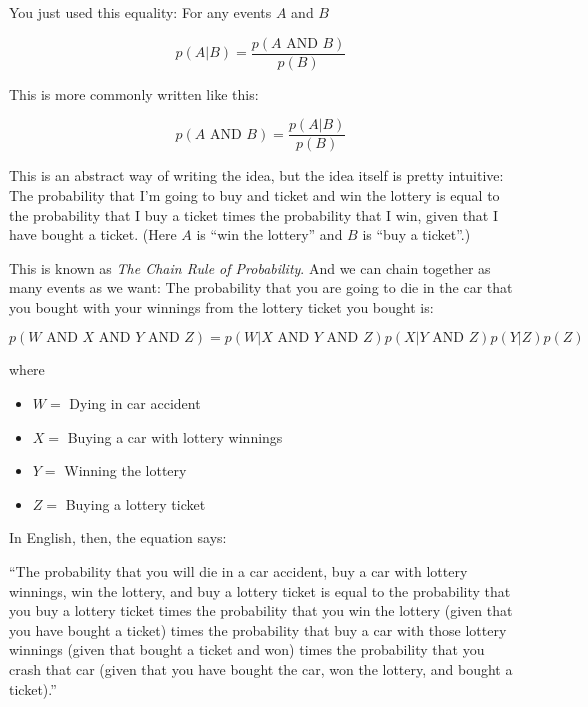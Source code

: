 You just used this equality: For any events $A$ and $B$

$$p(A | B) = \frac{p(A \text{ AND } B)}{p(B)}$$

This is more commonly written like this:

$$p(A \text{ AND } B) = \frac{p(A | B)}{p(B)}$$

This is an abstract way of writing the idea, but the idea itself
is pretty intuitive: The probability that I'm going to buy and ticket
and win the lottery is equal to the probability that I buy a ticket
times the probability that I win, given that I have bought a ticket.
(Here $A$ is ``win the lottery'' and $B$ is ``buy a ticket''.)

This is known as \textit{The Chain Rule of Probability}.  And we can
chain together as many events as we want: The probability that you are
going to die in the car that you bought with your winnings from the
lottery ticket you bought is:

$$p(W \text{ AND } X \text{ AND } Y \text{ AND } Z) = p( W | X \text{ AND } Y \text{ AND } Z) p( X |  Y \text{ AND } Z) p (Y | Z) p(Z)$$

where

\begin{itemize}
\item $W =$ Dying in car accident
\item $X =$ Buying a car with lottery winnings
\item $Y =$ Winning the lottery
\item $Z =$ Buying a lottery ticket
\end{itemize}

In English, then, the equation says:

``The probability that you will die in a car accident, buy a car with
lottery winnings, win the lottery, and buy a lottery ticket is equal
to the probability that you buy a lottery ticket times the probability
that you win the lottery (given that you have bought a ticket) times
the probability that buy a car with those lottery winnings (given that
bought a ticket and won) times the probability that you crash that car
(given that you have bought the car, won the lottery, and bought a
ticket).''




  
